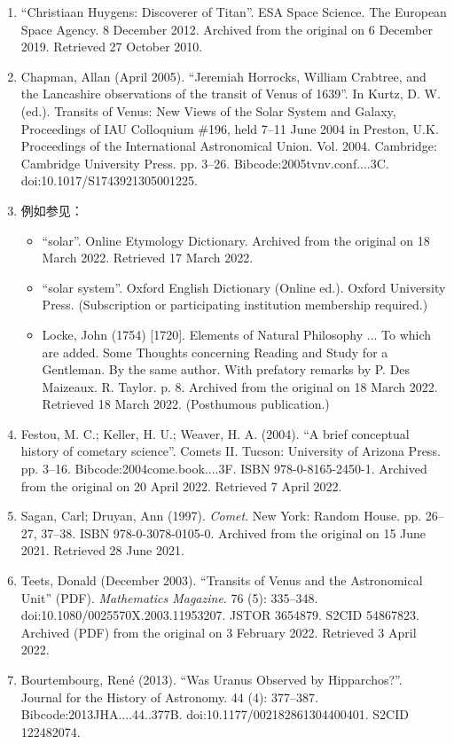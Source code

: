 \begin{enumerate}
\item ``Christiaan Huygens: Discoverer of Titan''. ESA Space Science. The European Space Agency. 8 December 2012. Archived from the original on 6 December 2019. Retrieved 27 October 2010.
\item Chapman, Allan (April 2005). ``Jeremiah Horrocks, William Crabtree, and the Lancashire observations of the transit of Venus of 1639''. In Kurtz, D. W. (ed.). Transits of Venus: New Views of the Solar System and Galaxy, Proceedings of IAU Colloquium \#196, held 7–11 June 2004 in Preston, U.K. Proceedings of the International Astronomical Union. Vol. 2004. Cambridge: Cambridge University Press. pp. 3–26. Bibcode:2005tvnv.conf....3C. doi:10.1017/S1743921305001225.
\item 例如参见：
\begin{itemize}
\item ``solar''. Online Etymology Dictionary. Archived from the original on 18 March 2022. Retrieved 17 March 2022.
\item ``solar system''. Oxford English Dictionary (Online ed.). Oxford University Press. (Subscription or participating institution membership required.)
\item Locke, John (1754) [1720]. Elements of Natural Philosophy ... To which are added. Some Thoughts concerning Reading and Study for a Gentleman. By the same author. With prefatory remarks by P. Des Maizeaux. R. Taylor. p. 8. Archived from the original on 18 March 2022. Retrieved 18 March 2022. (Posthumous publication.)
\end{itemize}
\item Festou, M. C.; Keller, H. U.; Weaver, H. A. (2004). ``A brief conceptual history of cometary science''. Comets II. Tucson: University of Arizona Press. pp. 3–16. Bibcode:2004come.book....3F. ISBN 978-0-8165-2450-1. Archived from the original on 20 April 2022. Retrieved 7 April 2022.
\item Sagan, Carl; Druyan, Ann (1997). \textit{Comet}. New York: Random House. pp. 26–27, 37–38. ISBN 978-0-3078-0105-0. Archived from the original on 15 June 2021. Retrieved 28 June 2021.
\item Teets, Donald (December 2003). ``Transits of Venus and the Astronomical Unit'' (PDF). \textit{Mathematics Magazine}. 76 (5): 335–348. doi:10.1080/0025570X.2003.11953207. JSTOR 3654879. S2CID 54867823. Archived (PDF) from the original on 3 February 2022. Retrieved 3 April 2022.
\item Bourtembourg, René (2013). ``Was Uranus Observed by Hipparchos?''. Journal for the History of Astronomy. 44 (4): 377–387. Bibcode:2013JHA....44..377B. doi:10.1177/002182861304400401. S2CID 122482074.

\end{enumerate}

